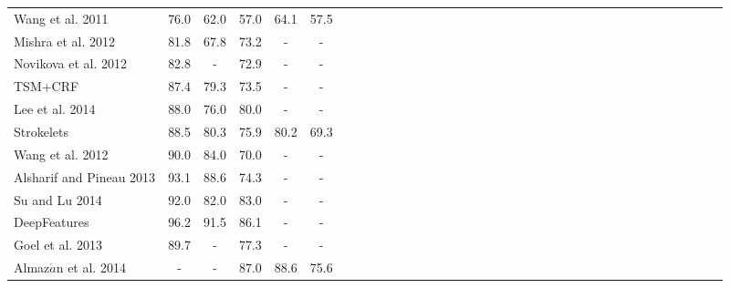 \documentclass[letterpaper]{article}
\begin{document}
\begin{table}[tb]
\begin{multicols}{2}
\begin{minipage}[t]{0\textwidth}
\begin{tabular}{|*{6}{l|c|c|c|c|c|}}
\hline
\hline
Wang et al. 2011 & 76.0 & 62.0 & 57.0 & 64.1 & 57.5\\
Mishra et al. 2012 & 81.8 & 67.8 & 73.2 & - & -\\
Novikova et al. 2012 & 82.8 & - & 72.9 & - & -\\
TSM+CRF\cite{Shi2013} & 87.4 & 79.3 & 73.5 & - & -\\
Lee et al. 2014 & 88.0 & 76.0 & 80.0 & - & -\\
Strokelets\cite{Yao2014} & 88.5 & 80.3 & 75.9 & 80.2 & 69.3\\
\hline
Wang et al. 2012 & 90.0 & 84.0 & 70.0 & - & -\\
Alsharif and Pineau 2013 & 93.1 & 88.6 & 74.3 & - & -\\
Su and Lu 2014 &92.0&82.0&83.0&-&-\\
DeepFeatures & 96.2 & 91.5 & 86.1 & - & -\\
\hline
Goel et al. 2013 & 89.7 & - & 77.3 & - & -\\
Almaz$\acute{a}$n et al. 2014 & - & - & 87.0 & 88.6 & 75.6\\
\hline


\end{tabular}
\end{minipage}
\end{multicols}
\end{table}
\end{document}

